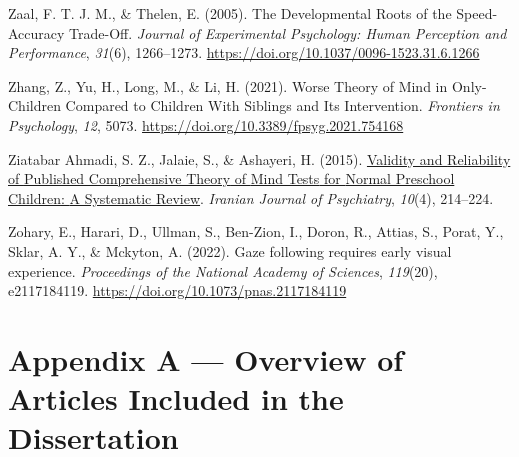 \documentclass[
]{scrbook}
\newlength{\cslhangindent}
\newenvironment{CSLReferences}[2] %
 {\begin{list}{}{%
  \setlength{\itemindent}{0pt}
  \setlength{\leftmargin}{0pt}
  \setlength{\parsep}{0pt}
  \ifodd #1
   \setlength{\leftmargin}{\cslhangindent}
   \setlength{\itemindent}{-1\cslhangindent}
  \fi
  \setlength{\itemsep}{#2\baselineskip}}}
 {\end{list}}
\begin{document}
\begin{CSLReferences}{1}{0}
Zaal, F. T. J. M., \& Thelen, E. (2005). The {Developmental Roots} of the {Speed-Accuracy Trade-Off}. \emph{Journal of Experimental Psychology: Human Perception and Performance}, \emph{31}(6), 1266--1273. \url{https://doi.org/10.1037/0096-1523.31.6.1266}

Zhang, Z., Yu, H., Long, M., \& Li, H. (2021). Worse {Theory} of {Mind} in {Only-Children Compared} to {Children With Siblings} and {Its Intervention}. \emph{Frontiers in Psychology}, \emph{12}, 5073. \url{https://doi.org/10.3389/fpsyg.2021.754168}

Ziatabar Ahmadi, S. Z., Jalaie, S., \& Ashayeri, H. (2015). \href{https://www.ncbi.nlm.nih.gov/pmc/articles/PMC4801491}{Validity and {Reliability} of {Published Comprehensive Theory} of {Mind Tests} for {Normal Preschool Children}: {A Systematic Review}}. \emph{Iranian Journal of Psychiatry}, \emph{10}(4), 214--224.

Zohary, E., Harari, D., Ullman, S., Ben-Zion, I., Doron, R., Attias, S., Porat, Y., Sklar, A. Y., \& Mckyton, A. (2022). Gaze following requires early visual experience. \emph{Proceedings of the National Academy of Sciences}, \emph{119}(20), e2117184119. \url{https://doi.org/10.1073/pnas.2117184119}

\end{CSLReferences}

\chapter{Appendix A --- Overview of Articles Included in the Dissertation}\label{appendixA}
\end{document}
